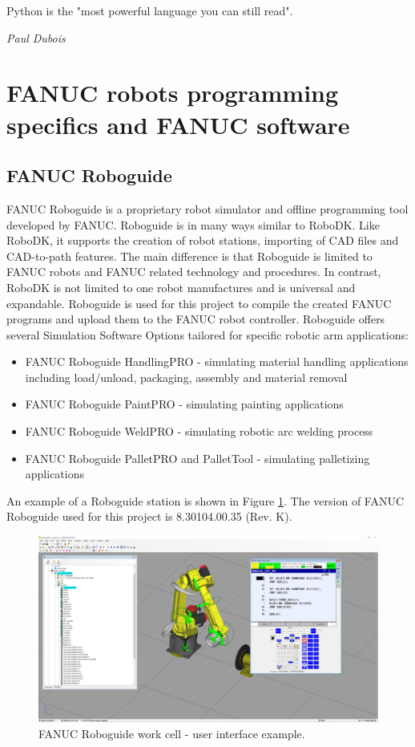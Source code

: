 \label{chap:implementation}

\epigraph{Python is the "most powerful language you can still read".}{\textit{Paul Dubois}}

\section{FANUC robots programming specifics and FANUC software}

\subsection{FANUC Roboguide}

FANUC Roboguide is a proprietary robot simulator and offline programming tool developed by FANUC. Roboguide is in many ways similar to RoboDK.  Like RoboDK, it supports the creation of robot stations, importing of CAD files and CAD-to-path features. The main difference is that Roboguide is limited to FANUC robots and FANUC related technology and procedures. In contrast, RoboDK is not limited to one robot manufactures and is universal and expandable. Roboguide is used for this project to compile the created FANUC programs and upload them to the FANUC robot controller. Roboguide offers several Simulation Software Options tailored for specific robotic arm applications:

\begin{itemize}

\item FANUC Roboguide HandlingPRO - simulating material handling applications including load/unload, packaging, assembly and material removal
\item FANUC Roboguide PaintPRO - simulating painting applications
\item FANUC Roboguide WeldPRO - simulating robotic arc welding process
\item FANUC Roboguide PalletPRO and PalletTool - simulating palletizing applications

\end{itemize}

An example of a Roboguide station is shown in Figure \ref{fig:roboguide}. The version of FANUC Roboguide used for this project is 8.30104.00.35 (Rev. K). 

\begin{figure}[h]
    \centering
    \includegraphics[width=0.9\linewidth]{img/roboguide.PNG}
    \caption{FANUC Roboguide work cell - user interface example.}
    \label{fig:roboguide}
\end{figure}

